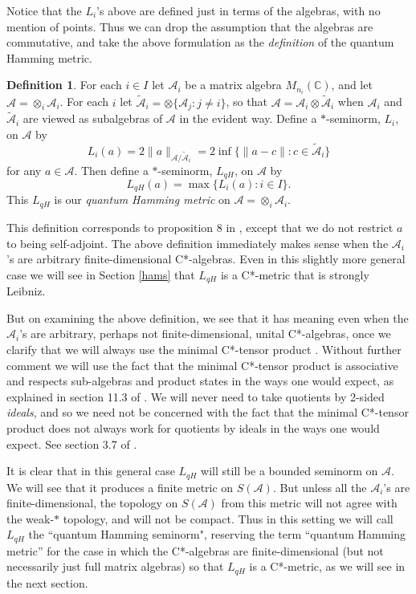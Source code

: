 \documentclass{amsart}[14pt]
\theoremstyle{definition}
\newtheorem{definition}[theorem]{Definition}
\theoremstyle{remark}
\newcommand{\cA}{{\mathcal A}}
\newcommand{\bC}{{\mathbb C}}
\newcommand{\<}{\langle}
\renewcommand{\>}{\rangle}
\numberwithin{equation}{section}
\begin{document}
{Notice that the $L_i$'s above are defined just in terms of the algebras,
with no mention of points. Thus we can drop the assumption that
the algebras are commutative, and take the above formulation as
the \emph{definition} of the quantum Hamming metric.

\begin{definition}
\label{sham}
For each $i \in I$ let $\cA_i$ be a 
matrix algebra $M_{n_i}(\bC)$, and let $\cA = \otimes_i \cA_i $.
For each $i$
let $\tilde \cA_i = \otimes\{\cA_j: j \neq i\}$, 
so that $\cA =  \cA_i \otimes \tilde \cA_i$ 
when $\cA_i$ and $\tilde \cA_i$ are viewed as subalgebras
of $\cA$ in the evident way.
Define a $*$-seminorm, $L_i$, on $\cA$ by 
\begin{equation}
\label{defLi}
L_i(a) = 2\|a\|_{\cA/ \tilde \cA_i} = 2\inf\{\|a - c\|: c \in \tilde \cA_i\}
\end{equation}
for any $a \in \cA$. 
Then define a $*$-seminorm, $L_{qH}$, on $\cA$ by 
\begin{equation}
\label{hamdef}
L_{qH}(a) = \max \{L_i(a): i \in I\}  .
\end{equation}
This $L_{qH}$ is our \emph{quantum Hamming metric} on $\cA = \otimes_i \cA_i $.
\end{definition}

This definition corresponds to proposition 8 in \cite{DMTL}, except that
we do not restrict $a$ to being self-adjoint. The above definition immediately
makes sense when the $ \cA_i $'s are arbitrary finite-dimensional
C*-algebras. Even in this slightly more general case
we will see in Section \ref{hams} that $L_{qH}$ is a C*-metric that 
is strongly Leibniz.    

But on examining the above definition, we see that it has meaning even
when the $\cA_i$'s are arbitrary, perhaps not finite-dimensional, 
unital C*-algebras, once we clarify that we
will always use the minimal C*-tensor product \cite{KR2}. Without
further comment we will use the fact that the minimal C*-tensor product
is associative and respects sub-algebras and product states 
in the ways one would expect, as explained in 
section 11.3 of \cite{KR2}. We will never need to take quotients
by 2-sided \emph{ideals}, and so we need not be concerned with the
fact that the minimal C*-tensor product does not always work for quotients by ideals 
in the ways one would expect. See section 3.7 of \cite{BrO}.

It is clear that in this general case $L_{qH}$ will
still be a bounded seminorm on $\cA$. We will see that it
produces a finite metric on $S(\cA)$. But unless all the $\cA_i$'s
are finite-dimensional, the topology on $S(\cA)$ from this metric will not
agree with the weak-$*$ topology, and will not be compact.
Thus in this setting 
we will call  $L_{qH}$ the ``quantum Hamming seminorm",
reserving the term ``quantum Hamming metric'' for the case
in which the C*-algebras are finite-dimensional (but not
necessarily just full matrix algebras) so that $L_{qH}$ is
a C*-metric, as we will see in the next section. 

}
\end{document}
